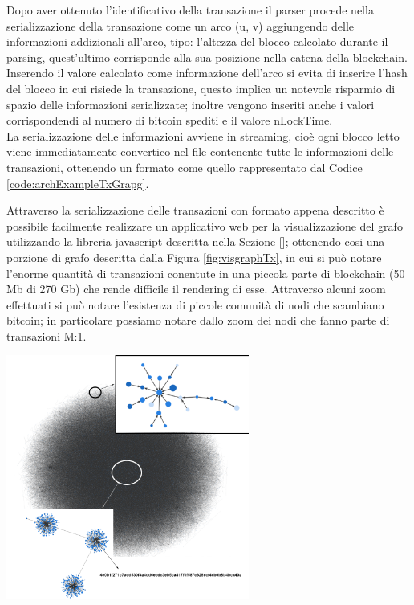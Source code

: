 \begin{example}
Dopo aver ottenuto l'identificativo della transazione il parser procede nella serializzazione della transazione come un arco (u, v) aggiungendo delle informazioni addizionali all'arco, tipo: l'altezza del blocco calcolato durante il parsing, quest'ultimo corrisponde alla sua posizione nella catena della blockchain.
Inserendo il valore calcolato come informazione dell'arco si evita di inserire l'hash del blocco in cui risiede la transazione, questo implica un notevole risparmio di spazio delle informazioni serializzate; inoltre vengono inseriti anche i valori corrispondendi al numero di bitcoin spediti e il valore nLockTime.\\
La serializzazione delle informazioni avviene in streaming, cioè ogni blocco letto viene immediatamente convertico nel file contenente tutte le informazioni delle transazioni, ottenendo un formato come quello rappresentato dal Codice \ref{code:archExampleTxGrapg}.\\



\end{example}

Attraverso la serializzazione delle transazioni con formato appena descritto è possibile facilmente realizzare un applicativo web per la visualizzazione del grafo utilizzando la libreria javascript descritta nella Sezione \ref{}; ottenendo cosi una porzione di grafo descritta dalla Figura \ref{fig:visgraphTx}, in cui si può notare l'enorme quantità di transazioni conentute in una piccola parte di blockchain (50 Mb di 270 Gb) che rende difficile il rendering di esse.
Attraverso alcuni zoom effettuati si può notare l'esistenza di piccole comunità di nodi che scambiano bitcoin; in particolare possiamo notare dallo zoom  dei nodi che fanno parte di transazioni M:1.
\newpage
{\centering
\vspace{15pt}
\includegraphics[width=80mm, scale=0.5]{images/demo/graph_tx_demo_presentation.png}
\vspace{10pt}
\par}

